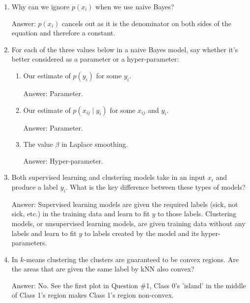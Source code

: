 \documentclass{article}
\newenvironment{answer}{\par\begingroup\color{gre}Answer: }{\endgroup}
\begin{document}
\begin{enumerate}
\begin{answer}
        \end{answer}
        \item Why can we ignore $p(x_i)$ when we use naive Bayes?
        \begin{answer}
        $p(x_i)$ cancels out as it is the denominator on both sides of the equation and therefore a constant.
        \end{answer}
        \item For each of the three values below in a naive Bayes model, say whether it's better considered as a parameter or a hyper-parameter:
        \begin{enumerate}
            \item Our estimate of $p(y_i)$ for some $y_i$.
            \begin{answer}
            Parameter.
            \end{answer}
            \item Our estimate of $p(x_{ij} \mid y_i)$ for some $x_{ij}$ and $y_i$.
            \begin{answer}
            Parameter.
            \end{answer}
            \item The value $\beta$ in Laplace smoothing.
            \begin{answer}
            Hyper-parameter.
            \end{answer}
        \end{enumerate}
        \item Both supervised learning and clustering models take in an input $x_i$ and produce a label $y_i$. What is the key difference between these types of models?
        \begin{answer}
        Supervised learning models are given the required labels (sick, not sick, etc.) in the training data and learn to fit $y$ to those labels. Clustering models, or unsupervised learning models, are given training data without any labels and learn to fit $y$ to labels created by the model and its hyper-parameters.
        \end{answer}
        \item In $k$-means clustering the clusters are guaranteed to be convex regions. Are the areas that are given the same label by kNN also convex?
        \begin{answer}
        No. See the first plot in Question \#1, Class 0's 'island' in the middle of Class 1's region makes Class 1's region non-convex.
        \end{answer}
    \end{enumerate}
\end{document}
